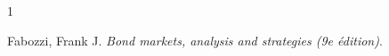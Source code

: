 \documentclass[letterpaper, 12pt]{article}
\newcommand{\1}{\mathds{1}}	%
\theoremstyle{definition}
\begin{document}
\begin{thebibliography}{1}

   Fabozzi, Frank J.
   \textit{Bond markets, analysis and strategies (9e édition)}.
 


\end{thebibliography}

\end{document}
